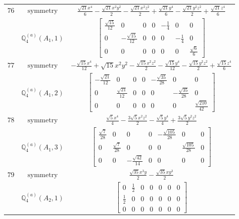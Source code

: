 \documentclass[fleqn,8pt,landscape]{jsarticle}
\begin{document}
\begin{longtable}{ccc}
$ 76 $ & $ \text{symmetry} $ & $ \frac{\sqrt{21} x^{4}}{6} - \frac{\sqrt{21} x^{2} y^{2}}{2} - \frac{\sqrt{21} x^{2} z^{2}}{2} + \frac{\sqrt{21} y^{4}}{6} - \frac{\sqrt{21} y^{2} z^{2}}{2} + \frac{\sqrt{21} z^{4}}{6} $ \\
$  $ & $ \mathbb{Q}_{4}^{(a)}(A_{1},1) $ & $ \begin{bmatrix} \frac{\sqrt{15}}{12} & 0 & 0 & 0 & - \frac{1}{4} & 0 & 0 \\ 0 & - \frac{\sqrt{15}}{12} & 0 & 0 & 0 & - \frac{1}{4} & 0 \\ 0 & 0 & 0 & 0 & 0 & 0 & \frac{\sqrt{6}}{6} \end{bmatrix} $ \\ \hline
$ 77 $ & $ \text{symmetry} $ & $ - \frac{\sqrt{15} x^{4}}{12} + \sqrt{15} x^{2} y^{2} - \frac{\sqrt{15} x^{2} z^{2}}{2} - \frac{\sqrt{15} y^{4}}{12} - \frac{\sqrt{15} y^{2} z^{2}}{2} + \frac{\sqrt{15} z^{4}}{6} $ \\
$  $ & $ \mathbb{Q}_{4}^{(a)}(A_{1},2) $ & $ \begin{bmatrix} - \frac{\sqrt{21}}{12} & 0 & 0 & 0 & - \frac{\sqrt{35}}{28} & 0 & 0 \\ 0 & \frac{\sqrt{21}}{12} & 0 & 0 & 0 & - \frac{\sqrt{35}}{28} & 0 \\ 0 & 0 & 0 & 0 & 0 & 0 & \frac{\sqrt{210}}{42} \end{bmatrix} $ \\ \hline
$ 78 $ & $ \text{symmetry} $ & $ \frac{\sqrt{5} x^{4}}{4} - \frac{3 \sqrt{5} x^{2} z^{2}}{2} - \frac{\sqrt{5} y^{4}}{4} + \frac{3 \sqrt{5} y^{2} z^{2}}{2} $ \\
$  $ & $ \mathbb{Q}_{4}^{(a)}(A_{1},3) $ & $ \begin{bmatrix} \frac{\sqrt{7}}{28} & 0 & 0 & 0 & - \frac{\sqrt{105}}{28} & 0 & 0 \\ 0 & \frac{\sqrt{7}}{28} & 0 & 0 & 0 & \frac{\sqrt{105}}{28} & 0 \\ 0 & 0 & - \frac{\sqrt{42}}{14} & 0 & 0 & 0 & 0 \end{bmatrix} $ \\ \hline
$ 79 $ & $ \text{symmetry} $ & $ \frac{\sqrt{35} x^{3} y}{2} - \frac{\sqrt{35} x y^{3}}{2} $ \\
$  $ & $ \mathbb{Q}_{4}^{(a)}(A_{2},1) $ & $ \begin{bmatrix} 0 & \frac{1}{2} & 0 & 0 & 0 & 0 & 0 \\ \frac{1}{2} & 0 & 0 & 0 & 0 & 0 & 0 \\ 0 & 0 & 0 & 0 & 0 & 0 & 0 \end{bmatrix} $ \\ \hline

\end{longtable}
\end{document}

